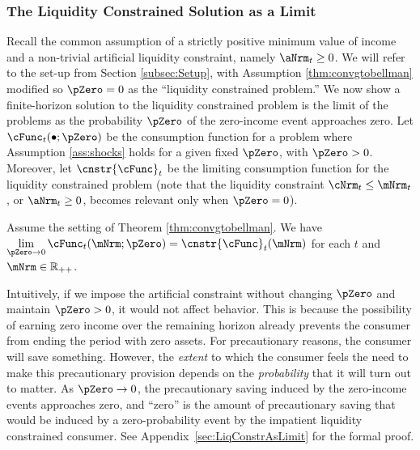 \documentclass[BufferStockTheory]{subfiles}
\begin{document}
\hypertarget{The-Liquidity-Constrained-Solution-as-a-Limit}{}
\subsubsection{The Liquidity Constrained Solution as a Limit}\label{subsubsec:deatonIsLimit}

Recall the common assumption \citep{deatonLiqConstr,aiyagari:ge, lsIncFluct, mstIncFluct} of a strictly positive minimum value of income and a non-trivial artificial liquidity constraint, namely $\aNrm_{t}\geq 0$. We will refer to the set-up from Section \ref{subsec:Setup}, with Assumption \ref{thm:convgtobellman} modified so $\pZero=0$ as the ``liquidity constrained problem.'' We now show a finite-horizon solution to the liquidity constrained problem is the limit of the problems as the probability $\pZero$ of the zero-income event approaches zero. Let $\cFunc_{t}(\bullet;\pZero)$ be the consumption function for a problem where Assumption \ref{ass:shocks} holds for a given fixed $\pZero$, with $\pZero>0$. Moreover, let $\cnstr{\cFunc}_{t}$ be the limiting consumption function for the liquidity constrained problem (note that the liquidity constraint $\cNrm_{t}\leq \mNrm_{t}$, or $\aNrm_{t}\geq 0$, becomes relevant only when $\pZero= 0$).

\begin{proposition}\label{prop:deatonIsLimit}
Assume the setting of Theorem \ref{thm:convgtobellman}. We have $\lim\limits_{\pZero \rightarrow 0} \cFunc_{t}(\mNrm;\pZero)  = \cnstr{\cFunc}_{t}(\mNrm)$ for each $t$ and $\mNrm\in \mathbb{R}_{++}$. 
\end{proposition}

Intuitively, if we impose the artificial constraint without changing $\pZero$ and maintain $\pZero>0$, it would not affect behavior. This is because the possibility of earning zero income over the remaining horizon already prevents the consumer from ending the period with zero assets.  For precautionary reasons, the consumer will save something. However, the \textit{extent} to which the consumer feels the need to make this precautionary provision depends on the \textit{probability} that it will turn out to matter.  As  $\pZero \rightarrow 0$, the   precautionary saving induced by the zero-income events approaches zero, and ``zero'' is the amount of precautionary saving that would be induced by a zero-probability event by the impatient liquidity constrained consumer. See Appendix~\ref{sec:LiqConstrAsLimit} for the formal proof. 
\end{document}
